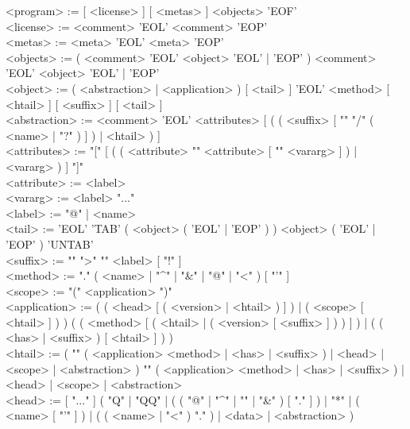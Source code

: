 \documentclass{article}
\begin{document}
\renewcommand\EbnfSpecial[1]{\textcolor{MidnightBlue}{\texttt{#1}}}
\renewcommand\EbnfTerminal[1]{\textcolor{Orange}{\texttt{"#1"}}}
\renewcommand\EbnfRegex[1]{\textcolor{PineGreen}{\texttt{#1}}}
\noindent
\begin{ebnf}[8em]
\small

<program> := [ <license> ] [ <metas> ] <objects> 'EOF' \\
<license> := <comment> { 'EOL' <comment> } 'EOP' \\
<metas> := <meta> { 'EOL' <meta> } 'EOP' \\
<objects> := ( { <comment> 'EOL' } <object> 'EOL' | 'EOP' ) { { <comment> 'EOL' } <object> 'EOL' | 'EOP' } \\
<object> := ( <abstraction> | <application> ) [ <tail> ] { 'EOL' <method> [ <htail> ] [ <suffix> ] [ <tail> ] } \\
<abstraction> := { <comment> 'EOL' } <attributes> [ ( ( <suffix> [ "\textvisiblespace{}" "/" ( <name> | "?" ) ] ) | <htail> ) ] \\
<attributes> := "[" [ ( ( <attribute> { "\textvisiblespace{}" <attribute> } [ "\textvisiblespace{}" <vararg> ] ) | <vararg> ) ] "]" \\
<attribute> := <label> \\
<vararg> := <label> "..." \\
<label> := "@" | <name> \\
<tail> := 'EOL' 'TAB' ( <object> ( 'EOL' | 'EOP' ) ) { <object> ( 'EOL' | 'EOP' ) } 'UNTAB' \\
<suffix> := "\textvisiblespace{}" ">" "\textvisiblespace{}" <label> [ "!" ] \\
<method> := "." ( <name> | "\^{}" | "\&" | "@" | "<" ) [ "'" ] \\
<scope> := "(" <application> ")" \\
<application> := ( ( <head> [ ( <version> | <htail> ) ] ) | ( <scope> [ <htail> ] ) ) { ( ( <method> [ ( <htail> | ( <version> [ <suffix> ] ) ) ] ) | ( ( <has> | <suffix> ) [ <htail> ] ) ) } \\
<htail> := ( "\textvisiblespace{}" ( <application> <method> | <has> | <suffix> ) | <head> | <scope> | <abstraction> ) { "\textvisiblespace{}" ( <application> <method> | <has> | <suffix> ) | <head> | <scope> | <abstraction> } \\
<head> := [ "..." ] ( "Q" | "QQ" | ( ( "@" | "\^{}" | "\textdollar" | "\&" ) [ "." ] ) | "*" | ( <name> [ "'" ] ) | ( ( <name> | "<" ) "." ) | <data> | <abstraction> ) \\

\end{ebnf}
\end{document}
